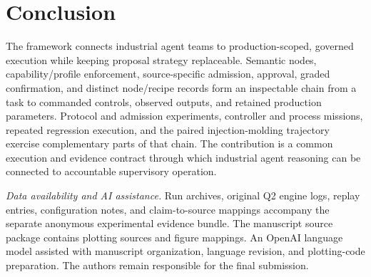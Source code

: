 \section{Conclusion}
\label{sec:conclusion}
The framework connects industrial agent teams to production-scoped,
governed execution while keeping proposal strategy replaceable. Semantic
nodes, capability/profile enforcement, source-specific admission, approval,
graded confirmation, and distinct node/recipe records form an inspectable
chain from a task to commanded controls, observed outputs, and retained
production parameters. Protocol and admission experiments, controller and
process missions, repeated regression execution, and the paired
injection-molding trajectory exercise complementary parts of that chain.
The contribution is a common execution and evidence contract through which
industrial agent reasoning can be connected to accountable supervisory
operation.

\noindent\textit{Data availability and AI assistance.}
Run archives, original Q2 engine logs, replay entries, configuration notes,
and claim-to-source mappings accompany the separate anonymous experimental
evidence bundle. The manuscript source package contains plotting sources
and figure mappings. An OpenAI language model assisted
with manuscript organization, language revision, and plotting-code
preparation. The authors remain responsible for the final submission.
